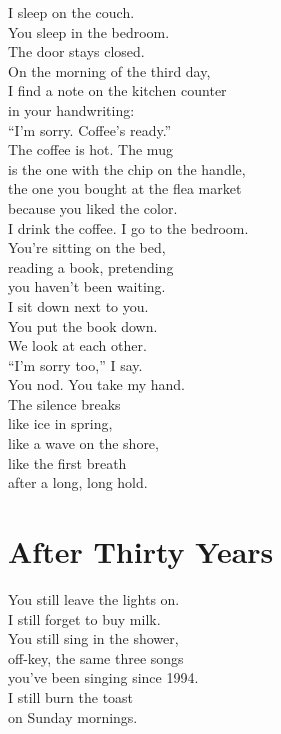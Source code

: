 \documentclass[
    language=english,
    doctype=poetry-collection,
    institution=none,
]{../../omnilatex}
\begin{document}
I sleep on the couch.\\
You sleep in the bedroom.\\
The door stays closed.\\

On the morning of the third day,\\
I find a note on the kitchen counter\\
in your handwriting:\\
``I'm sorry. Coffee's ready.''\\

The coffee is hot. The mug\\
is the one with the chip on the handle,\\
the one you bought at the flea market\\
because you liked the color.\\

I drink the coffee. I go to the bedroom.\\
You're sitting on the bed,\\
reading a book, pretending\\
you haven't been waiting.\\

I sit down next to you.\\
You put the book down.\\
We look at each other.\\

``I'm sorry too,'' I say.\\

You nod. You take my hand.\\

The silence breaks\\
like ice in spring,\\
like a wave on the shore,\\
like the first breath\\
after a long, long hold.

\section*{After Thirty Years}

You still leave the lights on.\\
I still forget to buy milk.\\
You still sing in the shower,\\
off-key, the same three songs\\
you've been singing since 1994.\\
I still burn the toast\\
on Sunday mornings.\\
\end{document}
